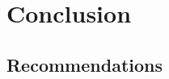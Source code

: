 \documentclass[class=report,11pt,crop=false]{standalone}
\begin{document}
\chapter{Conclusion} \label{ch:conclusion}
\vspace{-1cm}




\lipsum[1]
\section{Recommendations}
\lipsum[1]

\ifstandalone

\fi
\end{document}
